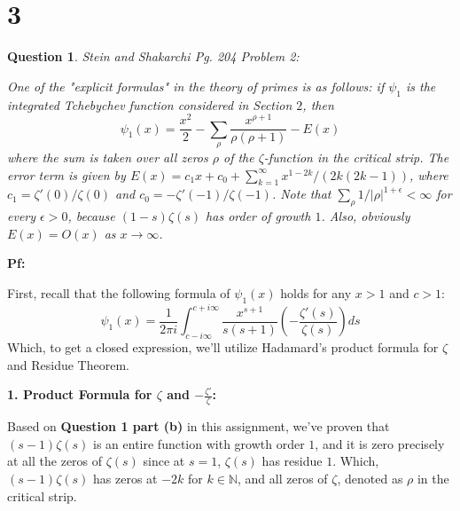 \documentclass{article}
\newtheorem{question}{Question}
\begin{document}
\begin{itemize}
\end{itemize}

\break

\section*{3}
\begin{myBox}[]{}
    \begin{question}
        Stein and Shakarchi Pg. 204 Problem 2:

        One of the "explicit formulas" in the theory of primes is as follows: if $\psi_1$ is the integrated Tchebychev function considered in Section $2$, then 
        $$\psi_1(x)=\frac{x^2}{2}-\sum_{\rho}\frac{x^{\rho+1}}{\rho(\rho+1)}-E(x)$$
        where the sum is taken over all zeros $\rho$ of the $\zeta$-function in the critical strip. The error term is given by $E(x)=c_1x+c_0+\sum_{k=1}^{\infty}x^{1-2k}/(2k(2k-1))$, where $c_1=\zeta'(0)/\zeta(0)$ and $c_0=-\zeta'(-1)/\zeta(-1)$. Note that $\sum_{\rho}1/|\rho|^{1+\epsilon}<\infty$ for every $\epsilon>0$, because $(1-s)\zeta(s)$ has order of growth $1$. Also, obviously $E(x)=O(x)$ as $x\rightarrow\infty$.
    \end{question}
\end{myBox}

\textbf{Pf:}

First, recall that the following formula of $\psi_1(x)$ holds for any $x>1$ and $c>1$:
$$\psi_1(x)=\frac{1}{2\pi i}\int_{c-i\infty}^{c+i\infty}\frac{x^{s+1}}{s(s+1)}\left(-\frac{\zeta'(s)}{\zeta(s)}\right)ds$$
Which, to get a closed expression, we'll utilize Hadamard's product formula for $\zeta$ and Residue Theorem.

\hfil

\textbf{1. Product Formula for $\zeta$ and $-\frac{\zeta'}{\zeta}$:}

Based on \textbf{Question 1 part (b)} in this assignment, we've proven that $(s-1)\zeta(s)$ is an entire function with growth order $1$, and it is zero precisely at all the zeros of $\zeta(s)$ since at $s=1$, $\zeta(s)$ has residue $1$. Which, $(s-1)\zeta(s)$ has zeros at $-2k$ for $k\in\mathbb{N}$, and all zeros of $\zeta$, denoted as $\rho$ in the critical strip.
\end{document}
